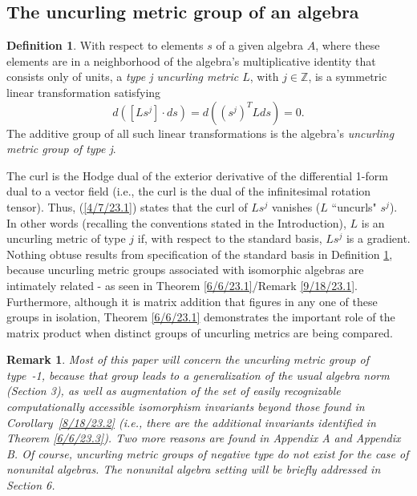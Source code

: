 \documentclass{amsart}
\numberwithin{equation}{section}
\newtheorem{remark}[theorem]{Remark}
\theoremstyle{definition}
\newtheorem{definition}[theorem]{Definition}
\numberwithin{theorem}{section}
\begin{document}
 
   
   \subsection{The uncurling metric group of an algebra}
     
  \begin{definition}\label{7/21/23.1} With respect to elements $s$ of a given algebra $A$, where these elements are in a neighborhood of the algebra's multiplicative identity that consists only of units, a  {\it type j uncurling metric $L$}, with $j\in \mathbb{Z}$, is a symmetric linear transformation  satisfying \begin{equation}\label{4/7/23.1} d([Ls^j]\cdot ds) = d\left((s^j)^T L ds\right) = 0. \end{equation}  The additive group of all such linear transformations is the algebra's {\it uncurling metric group of type j}.   \end{definition}
  
 
 The curl is the Hodge dual of the exterior derivative of the differential \mbox{1-form} dual to a vector field (i.e., the curl is the dual of the infinitesimal rotation tensor).  Thus, (\ref{4/7/23.1}) states that the curl of $Ls^j$ vanishes ($L$ ``uncurls" $s^j$).    In other words (recalling the conventions stated in the Introduction), $L$ is an uncurling metric of type $j$ if, with respect to the standard basis, $Ls^j$ is a gradient.   Nothing obtuse results from specification of the standard basis in Definition \ref{7/21/23.1}, because uncurling metric groups associated with isomorphic algebras are intimately related - as seen in Theorem \ref{6/6/23.1}/Remark \ref{9/18/23.1}.
  Furthermore, although it is matrix addition that figures in any one of these groups in isolation, Theorem \ref{6/6/23.1} demonstrates the important role of the matrix product when distinct groups of uncurling metrics are being compared.  
   
\begin{remark}\label{10/16/23.1} {\rm  Most of this paper will concern the uncurling metric group of \mbox{type -1}, because that group leads to a generalization of the usual algebra norm (Section 3), as well as augmentation of the set of easily recognizable computationally accessible isomorphism invariants beyond those found in \mbox{Corollary \ref{8/18/23.2}} (i.e., there are the additional invariants identified in Theorem \ref{6/6/23.3}). Two more reasons are found in Appendix A and Appendix B. Of course, uncurling metric groups of negative type do not exist for the case of nonunital algebras.  The nonunital algebra setting will be briefly addressed in Section 6.  } \end{remark}
 
\end{document}
